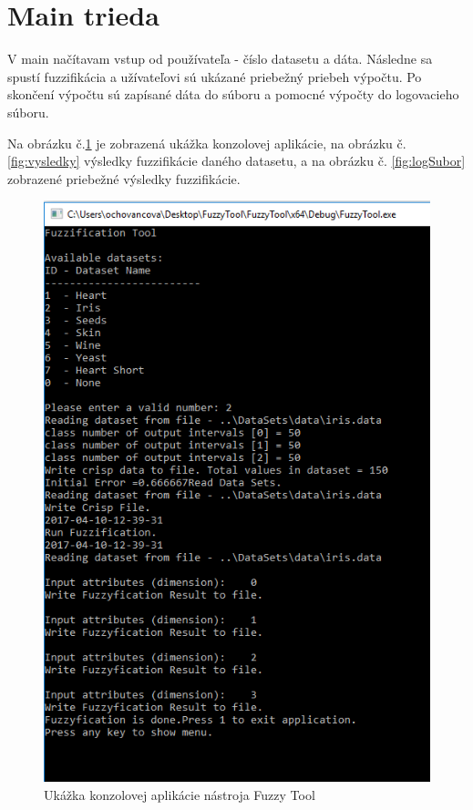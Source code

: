 \section{Main trieda}
V main načítavam vstup od používateľa - číslo datasetu a dáta. Následne sa spustí fuzzifikácia a užívateľovi sú ukázané priebežný priebeh výpočtu. Po skončení výpočtu sú zapísané dáta do súboru a pomocné výpočty do logovacieho súboru. 

Na obrázku č.\ref{fig:consola} je zobrazená ukážka konzolovej aplikácie, na obrázku č. \ref{fig:vysledky} výsledky fuzzifikácie daného datasetu, a na obrázku č. \ref{fig:logSubor} zobrazené priebežné výsledky fuzzifikácie. 

\begin{figure}[h]
\includegraphics{obrazky/consola1.PNG}
\centering
\caption{Ukážka konzolovej aplikácie nástroja Fuzzy Tool} 
\label{fig:consola}
\end{figure}

